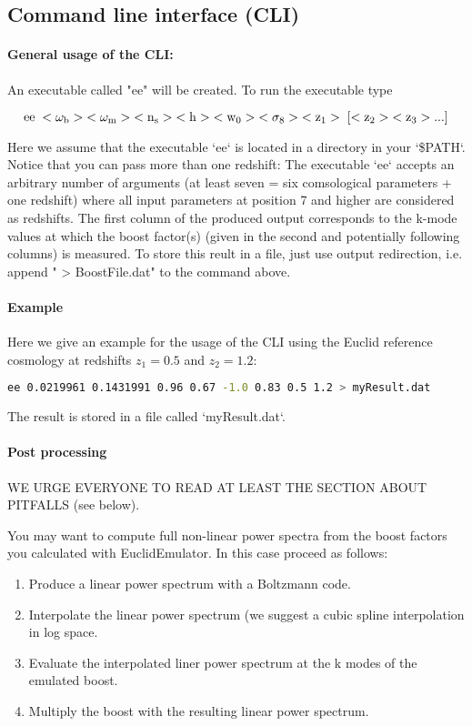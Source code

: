 \documentclass[american,11pt]{article}
\begin{document}
\subsection{Command line interface (CLI)}
\paragraph{General usage of the CLI:} An executable called "ee" will be created. To run the executable type 

\begin{equation}
\rm{ee}\;<\omega_{\rm b}>\;<\omega_{\rm m}>\;<n_{\rm s}>\;<h>\;<w_0>\;<\sigma_8>\;<z_1>\;[<z_2>\; <z_3> ...]
\end{equation}

Here we assume that the executable `ee` is located in a directory in your `\$PATH`. Notice that you can pass more than one redshift: The executable `ee` accepts an arbitrary number of arguments (at least seven = six comsological parameters + one redshift) where all input parameters at position 7 and higher are considered as redshifts. The first column of the produced output corresponds to the k-mode values at which the boost factor(s) (given in the second and potentially following columns) is measured. To store this reult in a file, just use output redirection, i.e. append " > BoostFile.dat" to the command above.

\paragraph{Example}
Here we give an example for the usage of the CLI using the Euclid reference cosmology at redshifts $z_1=0.5$ and $z_2=1.2$:

\begin{lstlisting}[language=bash]
   ee 0.0219961 0.1431991 0.96 0.67 -1.0 0.83 0.5 1.2 > myResult.dat
\end{lstlisting}
The result is stored in a file called `myResult.dat`.

\paragraph{Post processing}
WE URGE EVERYONE TO READ AT LEAST THE SECTION ABOUT PITFALLS (see below).

You may want to compute full non-linear power spectra from the boost factors you calculated with EuclidEmulator. In this case proceed as follows:

\begin{enumerate}
\item Produce a linear power spectrum with a Boltzmann code.
\item Interpolate the linear power spectrum (we suggest a cubic spline interpolation in log space.
\item Evaluate the interpolated liner power spectrum at the k modes of the emulated boost.
\item Multiply the boost with the resulting linear power spectrum.
\end{enumerate}
\end{document}
